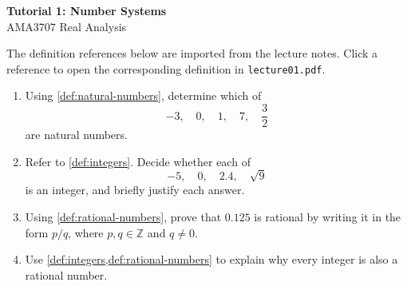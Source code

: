 \documentclass[12pt]{article}
\begin{document}
\begin{center}
  {\LARGE\bfseries Tutorial 1: Number Systems}\\[0.25em]
  {\large AMA3707 Real Analysis}\\[0.15em]
\end{center}

The definition references below are imported from the lecture notes. Click a
reference to open the corresponding definition in \texttt{lecture01.pdf}.

\begin{enumerate}[label=\textbf{Question \arabic*.},leftmargin=*]
  \item Using \cref{def:natural-numbers}, determine which of
  \[
    -3,\quad 0,\quad 1,\quad 7,\quad \frac{3}{2}
  \]
  are natural numbers.

  \item Refer to \cref{def:integers}. Decide whether each of
  \[
    -5,\quad 0,\quad 2.4,\quad \sqrt{9}
  \]
  is an integer, and briefly justify each answer.

  \item Using \cref{def:rational-numbers}, prove that \(0.125\) is
  rational by writing it in the form \(p/q\), where \(p,q\in\mathbb{Z}\) and
  \(q\neq0\).

  \item Use \cref{def:integers,def:rational-numbers} to explain
  why every integer is also a rational number.
\end{enumerate}
\end{document}
